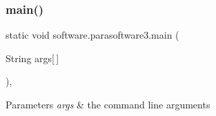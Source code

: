 \subsubsection{\texorpdfstring{main()}{main()}}
{\footnotesize\ttfamily static void software.\+parasoftware3.\+main (\begin{DoxyParamCaption}\item[{String}]{args\mbox{[}$\,$\mbox{]} }\end{DoxyParamCaption})\hspace{0.3cm}{\ttfamily [inline]}, {\ttfamily [static]}}


\begin{DoxyParams}{Parameters}
{\em args} & the command line arguments \\
\hline
\end{DoxyParams}

